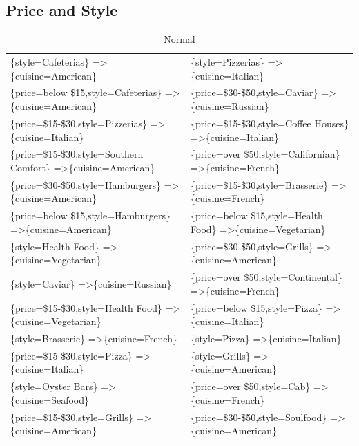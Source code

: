 \documentclass[letterpaper,10pt]{article}
\begin{document}
\begin{appendices}
\subsection*{Price and Style}
\begin{table}[h]
\centering
\caption*{Normal}
\begin{adjustbox}{max width=\textwidth}
\begin{tabular}{ll}
\{style=Cafeterias\} =\textgreater \{cuisine=American\} & \{style=Pizzerias\} =\textgreater \{cuisine=Italian\} \\ 
\{price=below \$15,style=Cafeterias\} =\textgreater \{cuisine=American\} & \{price=\$30-\$50,style=Caviar\} =\textgreater \{cuisine=Russian\} \\ 
\{price=\$15-\$30,style=Pizzerias\} =\textgreater \{cuisine=Italian\} & \{price=\$15-\$30,style=Coffee Houses\} =\textgreater \{cuisine=Italian\} \\ 
\{price=\$15-\$30,style=Southern Comfort\} =\textgreater \{cuisine=American\} & \{price=over \$50,style=Californian\} =\textgreater \{cuisine=French\} \\ 
\{price=\$30-\$50,style=Hamburgers\} =\textgreater \{cuisine=American\} & \{price=\$15-\$30,style=Brasserie\} =\textgreater \{cuisine=French\} \\ 
\{price=below \$15,style=Hamburgers\} =\textgreater \{cuisine=American\} & \{price=below \$15,style=Health Food\} =\textgreater \{cuisine=Vegetarian\} \\ 
\{style=Health Food\} =\textgreater \{cuisine=Vegetarian\} & \{price=\$30-\$50,style=Grills\} =\textgreater \{cuisine=American\} \\ 
\{style=Caviar\} =\textgreater \{cuisine=Russian\} & \{price=over \$50,style=Continental\} =\textgreater \{cuisine=French\} \\ 
\{price=\$15-\$30,style=Health Food\} =\textgreater \{cuisine=Vegetarian\} & \{price=below \$15,style=Pizza\} =\textgreater \{cuisine=Italian\} \\ 
\{style=Brasserie\} =\textgreater \{cuisine=French\} & \{style=Pizza\} =\textgreater \{cuisine=Italian\} \\ 
\{price=\$15-\$30,style=Pizza\} =\textgreater \{cuisine=Italian\} & \{style=Grills\} =\textgreater \{cuisine=American\} \\ 
\{style=Oyster Bars\} =\textgreater \{cuisine=Seafood\} & \{price=over \$50,style=Cab\} =\textgreater \{cuisine=French\} \\ 
\{price=\$15-\$30,style=Grills\} =\textgreater \{cuisine=American\} & \{price=\$30-\$50,style=Soulfood\} =\textgreater \{cuisine=American\} \\ 

\end{tabular}
\end{adjustbox}
\end{table}
\end{appendices}
\end{document}
